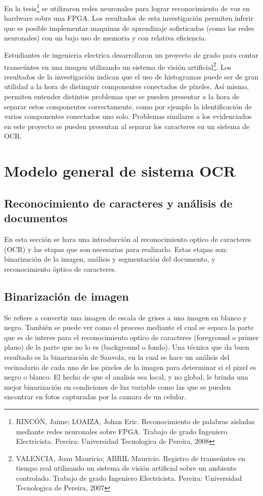 \documentclass[a4paper, 11pt, oneside]{report}
\begin{document}
En la tesis\footnote{RINCÓN, Jaime; LOAIZA, Johan Eric. Reconocimiento de palabras aisladas mediante redes neuronales sobre FPGA. Trabajo de grado Ingeniero Electricista. Pereira: Universidad Tecnologica de Pereira, 2008} se utilizaron redes neuronales para lograr reconocimiento de voz en hardware sobre una FPGA. Los resultados de esta investigación permiten inferir que es posible implementar maquinas de aprendizaje sofisticadas (como las redes neuronales) con un bajo uso de memoria y con relativa eficiencia.

Estudiantes de ingenieria electrica desarrollaron un proyecto de grado para contar transeúntes en una imagen utilizando un sistema de visión artificial\footnote{VALENCIA, Joan Mauricio; ABRIL Mauricio. Registro de transeúntes en tiempo real utilizando un sistema de visión artificial sobre un ambiente controlado. Trabajo de grado Ingeniero Electricista. Pereira: Universidad Tecnologica de Pereira, 2007}. Los resultados de la investigación indican que el uso de histogramas puede ser de gran utilidad a la hora de distinguir componentes conectados de píxeles. Así mismo, permiten entender distintos problemas que se pueden presentar a la hora de separar estos componentes correctamente, como por ejemplo la identificación de varios componentes conectados uno solo. Problemas similares a los evidenciados en este proyecto se pueden presentan al separar los caracteres en un sistema de OCR.
    
\section {Modelo general de sistema OCR}

\subsection{Reconocimiento de caracteres y análisis de documentos}

En esta sección se hara una introducción al reconocimiento optico de caracteres (OCR) y las etapas que son necesarias para realizarlo. Estas etapas son: binarización de la imagen, análisis y segmentación del documento, y reconocimiento óptico de caracteres.  

\subsection{Binarización de imagen}

Se refiere a convertir una imagen de escala de grises a una imagen en blanco y negro. También se puede ver como el proceso mediante el cual se separa la parte que es de interes para el reconocimiento optico de caracteres (foreground o primer plano) de la parte que no lo es (background o fondo). Una técnica que da buen resultado es la binarización de Sauvola, en la cual se hace un análisis del vecinadario de cada uno de los pixeles de la imagen para determinar si el pixel es negro o blanco. El hecho de que el analisis sea local, y no global, le brinda una mejor binarización en condiciones de luz variable como las que se pueden encontrar en fotos capturadas por la camara de un celular.
\end{document}
